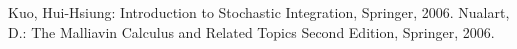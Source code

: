 \documentclass[a4paper,10pt]{jsarticle}
\theoremstyle{definition}
\begin{document}




\begin{thebibliography}{5}
	 Kuo, Hui-Hsiung: Introduction to Stochastic Integration, Springer, 2006.
	 Nualart, D.: The Malliavin Calculus and Related Topics Second Edition, Springer, 2006.
\end{thebibliography}
\end{document}
